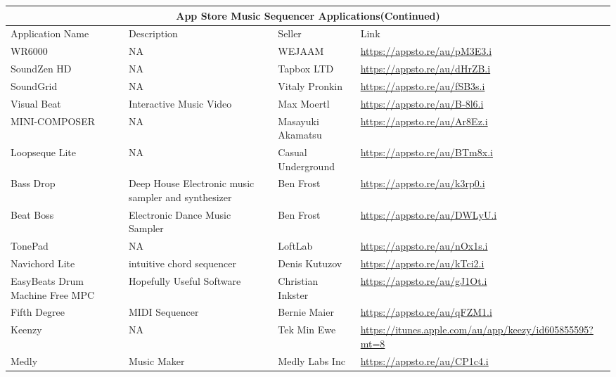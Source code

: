 \pagestyle{fancy}
\fancyfoot{}
\fancyfoot[C]{\thepage}

 \begin{tabular}{ |p{3cm}||p{3.5cm}|p{3.5cm}|p{3.5cm}||}
  \hline
  \multicolumn{4}{|c|}{App Store Music Sequencer Applications(Continued)} \\
  \hline
  Application Name   & Description  & Seller & Link\\
  \hline

  WR6000 & NA & WEJAAM &
  \url{https://appsto.re/au/pM3E3.i}\\

  SoundZen HD & NA & Tapbox LTD &
  \url{https://appsto.re/au/dHrZB.i}\\

  SoundGrid & NA & Vitaly Pronkin &
  \url{https://appsto.re/au/fSB3s.i}\\

  Visual Beat & Interactive Music Video & Max Moertl &
  \url{https://appsto.re/au/B-8l6.i}\\

  MINI-COMPOSER & NA & Masayuki Akamatsu &
  \url{https://appsto.re/au/Ar8Ez.i}\\

 Loopseque Lite & NA & Casual Underground &
 \url{https://appsto.re/au/BTm8x.i}\\

 Bass Drop & Deep House Electronic music sampler and synthesizer & Ben Frost &
 \url{https://appsto.re/au/k3rp0.i}\\

 Beat Boss & Electronic Dance Music Sampler & Ben Frost &
 \url{https://appsto.re/au/DWLyU.i}\\

 TonePad &NA& LoftLab &
 \url{https://appsto.re/au/nOx1s.i}\\

 Navichord Lite & intuitive chord sequencer & Denis Kutuzov &
 \url{https://appsto.re/au/kTci2.i}\\

 EasyBeats Drum Machine Free MPC & Hopefully Useful Software & Christian Inkster &
 \url{https://appsto.re/au/gJ1Ot.i}\\

 Fifth Degree & MIDI Sequencer & Bernie Maier &
 \url{https://appsto.re/au/qFZM1.i}\\

 Keenzy & NA & Tek Min Ewe &
 \url{https://itunes.apple.com/au/app/keezy/id605855595?mt=8}\\

 Medly &  Music Maker & Medly Labs Inc &
 \url{https://appsto.re/au/CP1c4.i}\\
 \hline

\end{tabular}
